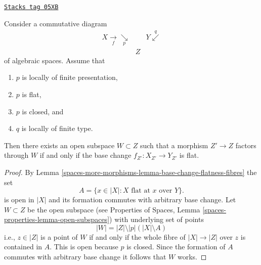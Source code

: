 \begin{lemma}
\label{spaces-more-morphisms-lemma-where-flat}
\href{https://stacks.math.columbia.edu/tag/05XB}{\texttt{Stacks tag 05XB}}

Consider a commutative diagram
$$
\begin{array}{ccc}X \underset{f}{\longrightarrow}\underset{p}{\searrow} &  & Y \overset{q}{\swarrow} \\  & Z & \end{array}
$$
of algebraic spaces. Assume that
\begin{enumerate}
\item $p$ is locally of finite presentation,
\item $p$ is flat,
\item $p$ is closed, and
\item $q$ is locally of finite type.
\end{enumerate}
Then there exists an open subspace $W \subset Z$
such that a morphism $Z' \to Z$ factors through $W$ if and only if the
base change $f_{Z'} : X_{Z'} \to Y_{Z'}$ is flat.
\end{lemma}

\begin{proof}
By Lemma \ref{spaces-more-morphisms-lemma-base-change-flatness-fibres}
the set
$$
A = \{x \in |X| : X\text{ flat at }x \text{ over }Y\}.
$$
is open in $|X|$ and its formation commutes with arbitrary base
change. Let $W \subset Z$ be the open subspace
(see
Properties of Spaces, Lemma
\ref{spaces-properties-lemma-open-subspaces})
with underlying set of points
$$
|W| = |Z| \setminus |p|\left(|X| \setminus A\right)
$$
i.e., $z \in |Z|$ is a point of $W$ if and only if the whole fibre
of $|X| \to |Z|$ over $z$ is contained in $A$. This is open because
$p$ is closed. Since the formation of $A$ commutes with arbitrary
base change it follows that $W$ works.
\end{proof}

